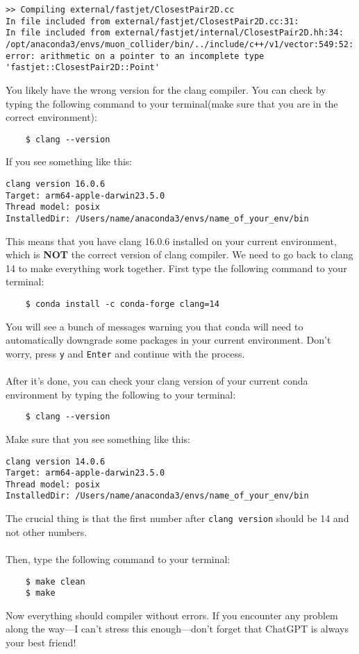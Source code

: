 \documentclass[12pt, english]{article}
\begin{document}
\begin{lstlisting}
>> Compiling external/fastjet/ClosestPair2D.cc
In file included from external/fastjet/ClosestPair2D.cc:31:
In file included from external/fastjet/internal/ClosestPair2D.hh:34:
/opt/anaconda3/envs/muon_collider/bin/../include/c++/v1/vector:549:52: error: arithmetic on a pointer to an incomplete type 'fastjet::ClosestPair2D::Point'
\end{lstlisting}
You likely have the wrong version for the clang compiler. You can check by typing the following command to your terminal(make sure that you are in the correct environment):
\begin{lstlisting}
    $ clang --version
\end{lstlisting}
If you see something like this:
\begin{lstlisting}
clang version 16.0.6
Target: arm64-apple-darwin23.5.0
Thread model: posix
InstalledDir: /Users/name/anaconda3/envs/name_of_your_env/bin
\end{lstlisting}
This means that you have clang 16.0.6 installed on your current environment, which is \textbf{NOT} the correct version of clang compiler. We need to go back to clang 14 to make everything work together. 
First type the following command to your terminal: 
\begin{lstlisting}
    $ conda install -c conda-forge clang=14
\end{lstlisting}
You will see a bunch of messages warning you that conda will need to automatically downgrade some packages in your current environment. Don't worry, press \texttt{y} and \texttt{Enter} and continue with the process. \\\\
After it's done, you can check your clang version of your current conda environment by typing the following to your terminal: 
\begin{lstlisting}
    $ clang --version
\end{lstlisting}
Make sure that you see something like this:
\begin{lstlisting}
clang version 14.0.6
Target: arm64-apple-darwin23.5.0
Thread model: posix
InstalledDir: /Users/name/anaconda3/envs/name_of_your_env/bin
\end{lstlisting}
The crucial thing is that the first number after \texttt{clang version} should be 14 and not other numbers. \\\\
Then, type the following command to your terminal:
\begin{lstlisting}
    $ make clean
    $ make
\end{lstlisting}
Now everything should compiler without errors. If you encounter any problem along the way---I can't stress this enough---don't forget that ChatGPT is always your best friend! \\\\
\end{document}
